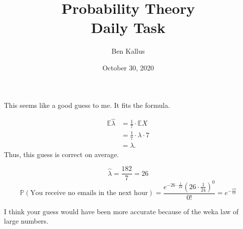 \documentclass[12pt]{article}
\title{Probability Theory \\ Daily Task}
\author{Ben Kallus}
\date{October 30, 2020}
\begin{document}
\color{white}
\pagecolor{black}
\maketitle

 This seems like a good guess to me. It fits the formula.

\medskip
{}
\begin{align*}
    \mathbb E\hat\lambda &= \frac17 \cdot \mathbb EX \\
                         &= \frac17 \cdot \lambda \cdot 7 \\
                         &= \lambda.
\end{align*} Thus, this guess is correct on average.

\medskip
{} $$\hat\lambda = \frac{182}7 = 26$$ $$\mathbb P(\text{You receive no emails in the next hour}) = \frac{e^{-26\cdot\frac1{24}}(26\cdot \frac1{24})^0}{0!} = e^{-\frac{13}{12}}$$

\medskip
{} I think your guess would have been more accurate because of the weka law of large numbers.
\end{document}
